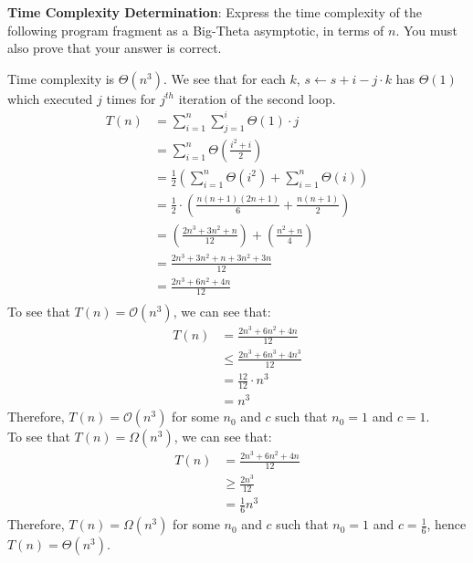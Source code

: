 \textbf{Time Complexity Determination}: Express the time complexity of the following program fragment as a 
Big-Theta asymptotic, in terms of $n$. You must also prove that your answer is correct.

\begin{algorithm}
    \SetAlgoLined
\end{algorithm}
\begin{customsolutionbox}
    Time complexity is $\Theta(n^3)$. We see that for each $k$, $s \gets s + i - j \cdot k$ has $\Theta(1)$ which 
    executed $j$ times for $j^{th}$ iteration of the second loop.
    \begin{align}
        T(n) &=  \sum_{i=1}^{n} \sum_{j=1}^{i} \Theta(1) \cdot j \\
        &= \sum_{i=1}^{n} \Theta\left(\frac{i^2 + i}{2}\right)\\
        &= \frac{1}{2}\left(\sum_{i=1}^{n} \Theta(i^2)+\sum_{i=1}^{n}  \Theta(i)\right)\\
        &= \frac{1}{2} \cdot\left(\frac{n(n+1)(2n+1)}{6}+ \frac{n(n+1)}{2}\right) \\
        &= \left(\frac{2n^3+3n^2+n}{12}\right) + \left(\frac{n^2+n}{4}\right) \\
        &=  \frac{2n^3+3n^2+n+3n^2+3n}{12} \\
        &=  \frac{2n^3+6n^2+4n}{12} \\
    \end{align}
    To see that $T(n) = \mathcal{O}(n^3)$, we can see that:
    \begin{align}
        T(n) &= \frac{2n^3+6n^2+4n}{12} \\
        &\leq  \frac{2n^3+6n^3+4n^3}{12} \\
        &= \frac{12}{12} \cdot n^3 \\
        &= n^3
    \end{align}
    Therefore, $T(n) = \mathcal{O}(n^3)$ for some $n_0$ and $c$ such that $n_0 = 1$ and $c = 1$. \\
    To see that $T(n) = \Omega(n^3)$, we can see that:
    \begin{align}
        T(n) &= \frac{2n^3+6n^2+4n}{12} \\
        &\geq  \frac{2n^3}{12} \\
        &= \frac{1}{6} n^3
    \end{align}
    Therefore, $T(n) = \Omega(n^3)$ for some $n_0$ and $c$ such that $n_0 = 1$ and $c = \frac{1}{6}$, hence
    $T(n) = \Theta(n^3)$. \\
\end{customsolutionbox}